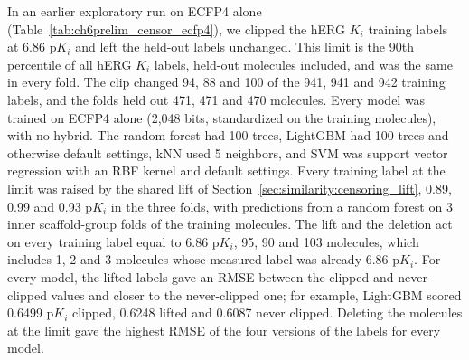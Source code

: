 
In an earlier exploratory run on ECFP4 alone (Table~\ref{tab:ch6prelim_censor_ecfp4}), we clipped the hERG $K_i$ training labels at 6.86 p$K_i$ and left the held-out labels unchanged. This limit is the 90th percentile of all hERG $K_i$ labels, held-out molecules included, and was the same in every fold. The clip changed 94, 88 and 100 of the 941, 941 and 942 training labels, and the folds held out 471, 471 and 470 molecules. Every model was trained on ECFP4 alone (2,048 bits, standardized on the training molecules), with no hybrid. The random forest had 100 trees, LightGBM had 100 trees and otherwise default settings, kNN used 5 neighbors, and SVM was support vector regression with an RBF kernel and default settings. Every training label at the limit was raised by the shared lift of Section~\ref{sec:similarity:censoring_lift}, 0.89, 0.99 and 0.93 p$K_i$ in the three folds, with predictions from a random forest on 3 inner scaffold-group folds of the training molecules. The lift and the deletion act on every training label equal to 6.86 p$K_i$, 95, 90 and 103 molecules, which includes 1, 2 and 3 molecules whose measured label was already 6.86 p$K_i$. For every model, the lifted labels gave an RMSE between the clipped and never-clipped values and closer to the never-clipped one; for example, LightGBM scored 0.6499 p$K_i$ clipped, 0.6248 lifted and 0.6087 never clipped. Deleting the molecules at the limit gave the highest RMSE of the four versions of the labels for every model.

